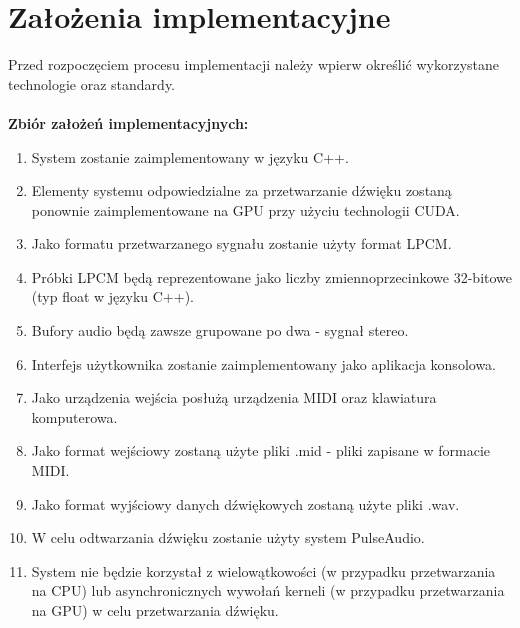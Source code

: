 \section{Założenia implementacyjne}
Przed rozpoczęciem procesu implementacji należy wpierw określić wykorzystane technologie oraz standardy.
\\\\
\textbf{Zbiór założeń implementacyjnych:}
\begin{enumerate}
    \item System zostanie zaimplementowany w języku C++.
    \item Elementy systemu odpowiedzialne za przetwarzanie dźwięku zostaną ponownie zaimplementowane na GPU przy użyciu technologii CUDA.
    \item Jako formatu przetwarzanego sygnału zostanie użyty format LPCM.
    \item Próbki LPCM będą reprezentowane jako liczby zmiennoprzecinkowe 32-bitowe (typ float w języku C++).
    \item Bufory audio będą zawsze grupowane po dwa - sygnał stereo.
    \item Interfejs użytkownika zostanie zaimplementowany jako aplikacja konsolowa.
    \item Jako urządzenia wejścia posłużą urządzenia MIDI oraz klawiatura komputerowa.
    \item Jako format wejściowy zostaną użyte pliki .mid - pliki zapisane w formacie MIDI.
    \item Jako format wyjściowy danych dźwiękowych zostaną użyte pliki .wav.
    \item W celu odtwarzania dźwięku zostanie użyty system PulseAudio.
    \item System nie będzie korzystał z wielowątkowości (w przypadku przetwarzania na CPU) lub asynchronicznych wywołań kerneli (w przypadku przetwarzania na GPU) w celu przetwarzania dźwięku.
\end{enumerate}

